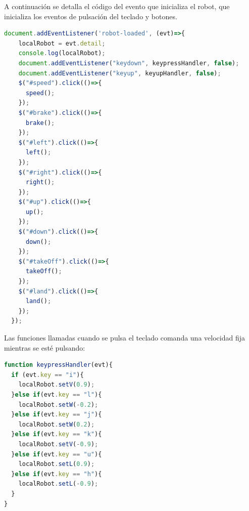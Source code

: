 A continuación se detalla el código del evento que inicializa el robot, que inicializa los eventos de pulsación del teclado y botones.

\begin{lstlisting}[language=javascript,label=list:traduccion]
  document.addEventListener('robot-loaded', (evt)=>{
    localRobot = evt.detail;
    console.log(localRobot);
    document.addEventListener("keydown", keypressHandler, false);
    document.addEventListener("keyup", keyupHandler, false);
    $("#speed").click(()=>{
      speed();
    });
    $("#brake").click(()=>{
      brake();
    });
    $("#left").click(()=>{
      left();
    });
    $("#right").click(()=>{
      right();
    });
    $("#up").click(()=>{
      up();
    });
    $("#down").click(()=>{
      down();
    });
    $("#takeOff").click(()=>{
      takeOff();
    });
    $("#land").click(()=>{
      land();
    });
  });
\end{lstlisting}

Las funciones llamadas cuando se pulsa el teclado comanda una velocidad fija mientras se esté pulsando: 

\begin{lstlisting}[language=javascript,label=list:teclado]
function keypressHandler(evt){
  if (evt.key == "i"){
    localRobot.setV(0.9);
  }else if(evt.key == "l"){
    localRobot.setW(-0.2);
  }else if(evt.key == "j"){
    localRobot.setW(0.2);
  }else if(evt.key == "k"){
    localRobot.setV(-0.9);
  }else if(evt.key == "u"){
    localRobot.setL(0.9);
  }else if(evt.key == "h"){
    localRobot.setL(-0.9);
  }
}
\end{lstlisting}


